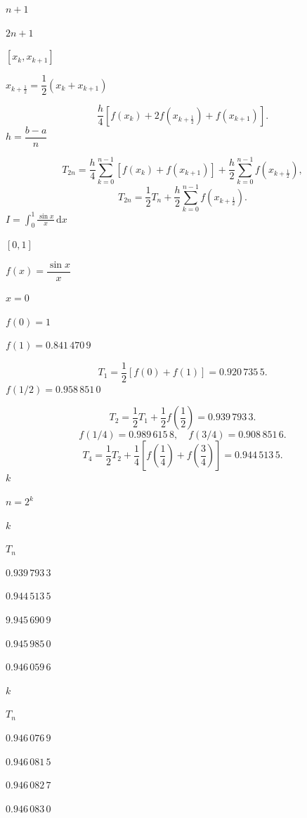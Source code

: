 \documentclass[UTF8,fontset=fandol]{ctexart}
\begin{document}
$n+1$\par
$2n+1$\par
$[x_k,x_{k+1}]$\par
$x_{k+\frac12}=\dfrac12(x_k+x_{k+1})$\par
\[ 
\frac h4[f(x_k)+2f(x_{k+\frac12})+f(x_{k+1})].
 \]
$h=\dfrac{b-a}{n}$\par
\[ 
T_{2n}=\frac h4\sum_{k=0}^{n-1}[f(x_k)+f(x_{k+1})]+\frac h2\sum_{k=0}^{n-1}f(x_{k+\frac12}),
 \]
\[ 
T_{2n}=\frac12T_n+\frac h2\sum_{k=0}^{n-1}f(x_{k+\frac12}).
\tag{4.3.1}
 \]
$I=\displaystyle\int_0^1\frac{\sin x}{x}\,\mathrm{d}x$\par
$[0,1]$\par
$f(x)=\dfrac{\sin x}{x}$\par
$x=0$\par
$f(0)=1$\par
$f(1)=0.841\,470\,9$\par
\[ 
T_1=\frac12[f(0)+f(1)]=0.920\,735\,5.
 \]
$f(1/2)=0.958\,851\,0$\par
\[ 
T_2=\frac12T_1+\frac12f\left(\frac12\right)=0.939\,793\,3.
 \]
\[ 
f(1/4)=0.989\,615\,8,\quad f(3/4)=0.908\,851\,6.
 \]
\[ 
T_4=\frac12T_2+\frac14\left[f\left(\frac14\right)+f\left(\frac34\right)\right]=0.944\,513\,5.
 \]
$k$\par
$n=2^k$\par
$k$\par
$T_n$\par
$0.939\,793\,3$\par
$0.944\,513\,5$\par
$9.945\,690\,9$\par
$0.945\,985\,0$\par
$0.946\,059\,6$\par
$k$\par
$T_n$\par
$0.946\,076\,9$\par
$0.946\,081\,5$\par
$0.946\,082\,7$\par
$0.946\,083\,0$\par
\end{document}
